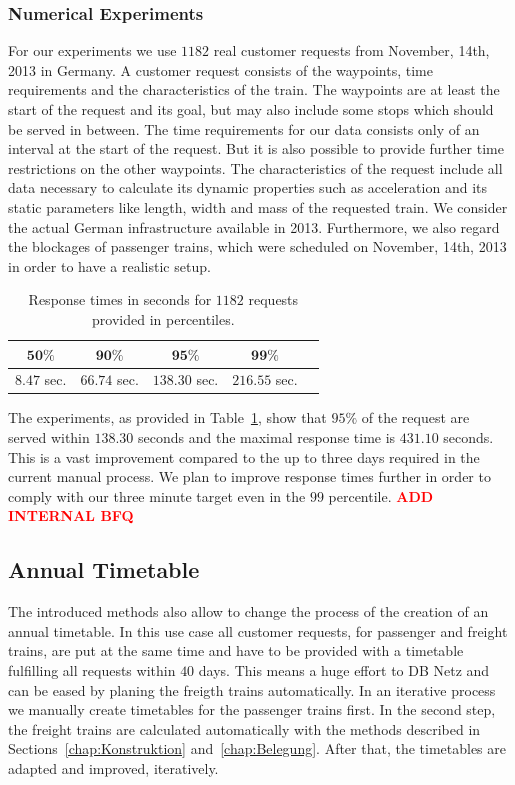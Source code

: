 \subsubsection{Numerical Experiments}
For our experiments we use $1182$ real customer requests from November, 14th, 2013 in Germany. A customer request consists of the waypoints, time requirements and the characteristics of the train. The waypoints are at least the start of the request and its goal, but may also include some stops which should be served in between. The time requirements for our data consists only of an interval at the start of the request. But it is also possible to provide further time restrictions on the other waypoints. The characteristics of the request include all data necessary to calculate its dynamic properties such as acceleration and its static parameters like length, width and mass of the requested train. We consider the actual German infrastructure available in 2013. Furthermore, we also regard the blockages of passenger trains, which were scheduled on November, 14th, 2013 in order to have a realistic setup.
%
\begin{table}[h]
	\centering
	\caption{Response times in seconds for $1182$ requests provided in percentiles.}
	\label{tab:result_CnR}
	\begin{tabular}{ccccc} \hline
		$\textbf{50\%}$ & $\textbf{90\%}$ & $\textbf{95\%}$ & $\textbf{99\%}$ \\ \hline
		$8.47$ sec.     & $66.74$ sec.    & $138.30$ sec.   & $216.55$ sec.   \\
	\end{tabular}
\end{table}
\par

The experiments, as provided in Table~\ref{tab:result_CnR}, show that $95\%$ of the request are served within $138.30$ seconds and the maximal response time is $431.10$ seconds. This is a vast improvement compared to the up to three days required in the current manual process. We plan to improve response times further in order to comply with our three minute target even in the $99$ percentile.
\textbf{\textcolor{red}{ADD INTERNAL BFQ}}

\subsection{Annual Timetable}
\label{chap:Netzfahrplan}

The introduced methods also allow to change the process of the creation of an annual timetable. In this use case all customer requests, for passenger and freight trains, are put at the same time and have to be provided with a timetable fulfilling all requests within $40$ days. This means a huge effort to DB Netz and can be eased by planing the freigth trains automatically. In an iterative process we manually create timetables for the passenger trains first. In the second step, the freight trains are calculated automatically with the methods described in Sections~\ref{chap:Konstruktion} and~\ref{chap:Belegung}. After that, the timetables are adapted and improved, iteratively.

